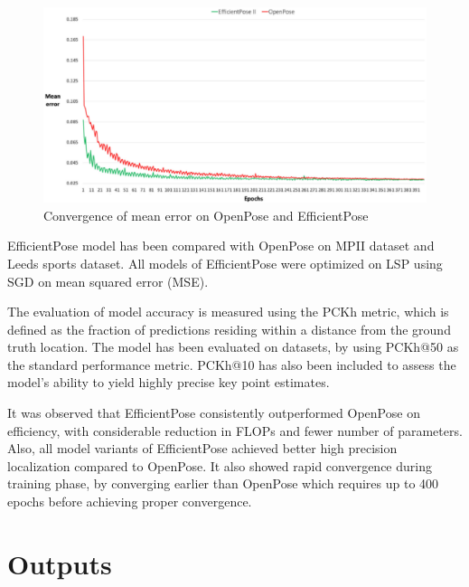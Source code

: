 \documentclass{fisatprojectfinal}
\begin{document}
\begin{figure}[h!]
	\begin{center}
	\includegraphics[scale=0.7]{TrainProgression}
	\caption{Convergence of mean error on OpenPose and EfficientPose}
\end{center}
\end{figure}
EfficientPose model has been compared with OpenPose on MPII dataset and Leeds sports dataset. All models of EfficientPose were optimized on LSP using SGD on mean squared error (MSE). 

The evaluation of model accuracy is measured using the PCKh metric, which is defined as the fraction of predictions residing within a distance from the ground truth location. The model has been evaluated on datasets, by using PCKh@50 as the standard performance metric. PCKh@10 has also been included to assess the model's ability to yield highly precise key point estimates.

It was observed that EfficientPose consistently outperformed OpenPose on efficiency, with considerable reduction in FLOPs and fewer number of parameters. Also, all model variants of EfficientPose achieved better high precision localization compared to OpenPose. It also showed rapid convergence during training phase, by converging earlier than OpenPose which requires up to 400 epochs before achieving proper convergence.

\chapter{Outputs}
\end{document}
